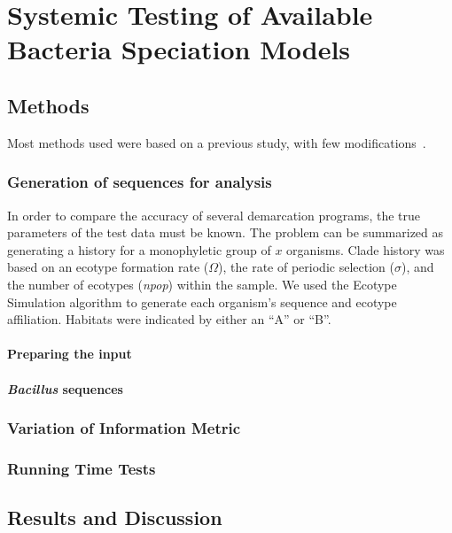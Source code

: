 \chapter{Systemic Testing of Available Bacteria Speciation Models}
\section{Methods}
Most methods used were based on a previous study, with few modifications~\cite{carlo}.
\subsection{Generation of sequences for analysis}
In order to compare the accuracy of several demarcation programs, the true parameters of the test data must be known.
The problem can be summarized as generating a history for a monophyletic group of $x$ organisms.
Clade history was based on an ecotype formation rate ($\Omega$), the rate of periodic selection ($\sigma$), and the number of ecotypes (\emph{npop}) within the sample.
We used the Ecotype Simulation algorithm to generate each organism's sequence and ecotype affiliation.
Habitats were indicated by either an ``A'' or ``B''.

\subsubsection{Preparing the input}


\subsubsection{\emph{Bacillus} sequences}
\subsection{Variation of Information Metric}
\subsection{Running Time Tests}
\section{Results and Discussion}

